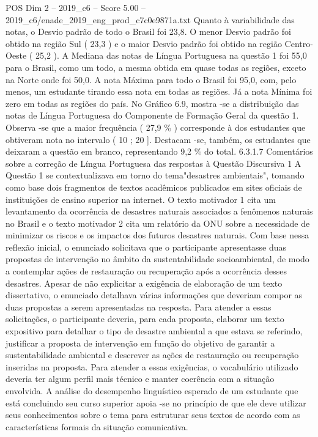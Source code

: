 \begin{textsample}{POS Dim 2 – 2019\_c6 – Score 5.00 – 2019\_c6/enade\_2019\_eng\_prod\_c7c0e9871a.txt}
Quanto à variabilidade das notas, o Desvio padrão de todo o Brasil foi 23,8.
O menor Desvio padrão foi obtido na região Sul ( 23,3 ) e o maior Desvio padrão foi obtido na região Centro-Oeste ( 25,2 ).
A Mediana das notas de Língua Portuguesa na questão 1 foi 55,0 para o Brasil, como um todo, a mesma obtida em quase todas as regiões, exceto na Norte onde foi 50,0.
A nota Máxima para todo o Brasil foi 95,0, com, pelo menos, um estudante tirando essa nota em todas as regiões.
Já a nota Mínima foi zero em todas as regiões do país.
No Gráfico 6.9, mostra -se a distribuição das notas de Língua Portuguesa do Componente de Formação Geral da questão 1.
Observa -se que a maior frequência ( 27,9 \% ) corresponde à dos estudantes que obtiveram nota no intervalo ( 10 ; 20 ].
Destacam -se, também, os estudantes que deixaram a questão em branco, representando 9,2 \% do total. 6.3.1.7 Comentários sobre a correção de Língua Portuguesa das respostas à Questão Discursiva 1 A Questão 1 se contextualizava em torno do tema"desastres ambientais", tomando como base dois fragmentos de textos acadêmicos publicados em sites oficiais de instituições de ensino superior na internet.
O texto motivador 1 cita um levantamento da ocorrência de desastres naturais associados a fenômenos naturais no Brasil e o texto motivador 2 cita um relatório da ONU sobre a necessidade de minimizar os riscos e os impactos dos futuros desastres naturais.
Com base nessa reflexão inicial, o enunciado solicitava que o participante apresentasse duas propostas de intervenção no âmbito da sustentabilidade socioambiental, de modo a contemplar ações de restauração ou recuperação após a ocorrência desses desastres.
Apesar de não explicitar a exigência de elaboração de um texto dissertativo, o enunciado detalhava várias informações que deveriam compor as duas propostas a serem apresentadas na resposta.
Para atender a essas solicitações, o participante deveria, para cada proposta, elaborar um texto expositivo para detalhar o tipo de desastre ambiental a que estava se referindo, justificar a proposta de intervenção em função do objetivo de garantir a sustentabilidade ambiental e descrever as ações de restauração ou recuperação inseridas na proposta.
Para atender a essas exigências, o vocabulário utilizado deveria ter algum perfil mais técnico e manter coerência com a situação envolvida.
A análise do desempenho linguístico esperado de um estudante que está concluindo seu curso superior apoia -se no princípio de que ele deve utilizar seus conhecimentos sobre o tema para estruturar seus textos de acordo com as características formais da situação comunicativa.

\end{textsample}
